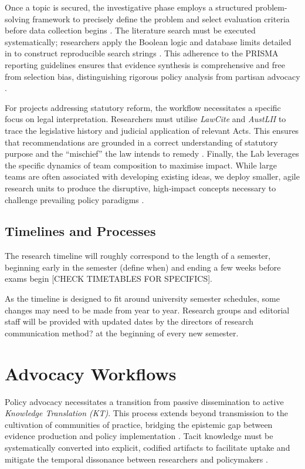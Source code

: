 \documentclass[12pt, a4paper]{article}
\begin{document}
Once a topic is secured, the investigative phase employs a structured problem-solving framework to precisely define the problem and select evaluation criteria before data collection begins \citep{bardach_practical_2024}. The literature search must be executed systematically; researchers apply the Boolean logic and database limits detailed in  to construct reproducible search strings \citep{watson_how_2020}. This adherence to the PRISMA reporting guidelines ensures that evidence synthesis is comprehensive and free from selection bias, distinguishing rigorous policy analysis from partisan advocacy \citep{page_prisma_2021}.

For projects addressing statutory reform, the workflow necessitates a specific focus on legal interpretation. Researchers must utilise \textit{LawCite} and \textit{AustLII} to trace the legislative history and judicial application of relevant Acts. This ensures that recommendations are grounded in a correct understanding of statutory purpose and the ``mischief'' the law intends to remedy \citep{barnes_modern_2023}. Finally, the Lab leverages the specific dynamics of team composition to maximise impact. While large teams are often associated with developing existing ideas, we deploy smaller, agile research units to produce the disruptive, high-impact concepts necessary to challenge prevailing policy paradigms \citep{wu_large_2019}.

\subsection{Timelines and Processes}
The research timeline will roughly correspond to the length of a semester, beginning early in the semester (define when) and ending a few weeks before exams begin [CHECK TIMETABLES FOR SPECIFICS].

As the timeline is designed to fit around university semester schedules, some changes may need to be made from year to year. Research groups and editorial staff will be provided with updated dates by the directors of research {communication method?} at the beginning of every new semester.

\section{Advocacy Workflows}
Policy advocacy necessitates a transition from passive dissemination to active \emph{Knowledge Translation (KT)}. This process extends beyond transmission to the cultivation of communities of practice, bridging the epistemic gap between evidence production and policy implementation \citep{roland_social_2018}. Tacit knowledge must be systematically converted into explicit, codified artifacts to facilitate uptake and mitigate the temporal dissonance between researchers and policymakers \citep{wagner_knowledge_2015, brownson_researchers_2006}.
\end{document}
